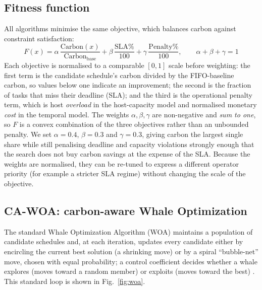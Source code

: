 \documentclass[12pt,a4paper]{article}
\begin{document}
\subsection{Fitness function}
All algorithms minimise the same objective, which balances carbon against constraint satisfaction:
\begin{equation}
F(x)=\alpha\,\frac{\mathrm{Carbon}(x)}{\mathrm{Carbon}_{\text{base}}}
     +\beta\,\frac{\mathrm{SLA}\%}{100}
     +\gamma\,\frac{\mathrm{Penalty}\%}{100},
\qquad \alpha+\beta+\gamma=1
\label{eq:fitness}
\end{equation}
Each objective is normalised to a comparable $[0,1]$ scale before weighting: the first term is the
candidate schedule's carbon divided by the FIFO-baseline carbon, so values below one indicate an
improvement; the second is the fraction of tasks that miss their deadline (SLA); and the third is the
operational penalty term, which is host \emph{overload} in the host-capacity model and normalised
monetary \emph{cost} in the temporal model. The weights $\alpha,\beta,\gamma$ are non-negative and
\emph{sum to one}, so $F$ is a convex combination of the three objectives rather than an unbounded
penalty. We set $\alpha=0.4$, $\beta=0.3$ and $\gamma=0.3$, giving carbon the largest single share
while still penalising deadline and capacity violations strongly enough that the search does not buy
carbon savings at the expense of the SLA. Because the weights are normalised, they can be re-tuned to
express a different operator priority (for example a stricter SLA regime) without changing the scale of
the objective.

\subsection{CA-WOA: carbon-aware Whale Optimization}
The standard Whale Optimization Algorithm (WOA) maintains a population of candidate schedules and, at
each iteration, updates every candidate either by encircling the current best solution (a shrinking
move) or by a spiral ``bubble-net'' move, chosen with equal probability; a control coefficient decides
whether a whale explores (moves toward a random member) or exploits (moves toward the best)
\cite{mirjalili2016whale}. This standard loop is shown in Fig.~\ref{fig:woa}.
\end{document}
